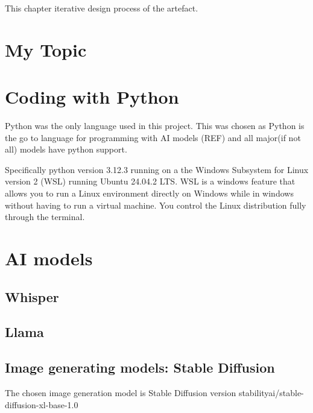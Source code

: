 \label{sec:Implementation}
This chapter iterative design process of the artefact.
\section{My Topic}


\section{Coding with Python}
Python was the only language used in this project. This was chosen as Python is the go to language for programming with AI models (REF) and all major(if not all) models have python support.

Specifically python version 3.12.3 running on a the Windows Subsystem for Linux version 2 (WSL) running Ubuntu 24.04.2 LTS. WSL is a windows feature that allows you to run a Linux environment directly on Windows while in windows without having to run a virtual machine. You control the Linux distribution fully through the terminal.

\section{AI models}

\subsection{Whisper}

\subsection{Llama}

\subsection{Image generating models: Stable Diffusion}
The chosen image generation model is Stable Diffusion version stabilityai/stable-diffusion-xl-base-1.0 \cite{StableDiffusionGit}


